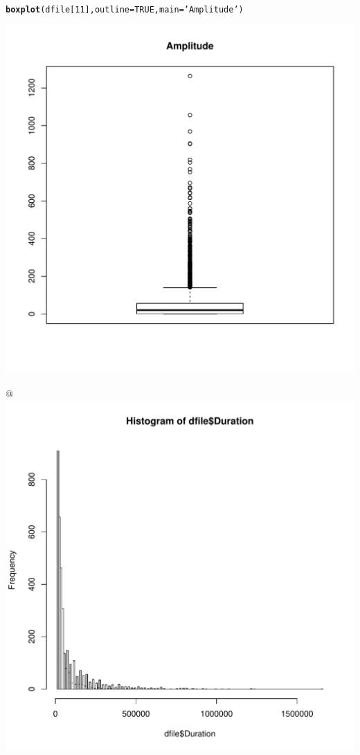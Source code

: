 \documentclass{article}\usepackage[]{graphicx}\usepackage[]{color}
\makeatletter
\def\maxwidth{ %
  \ifdim\Gin@nat@width>\linewidth
    \linewidth
  \else
    \Gin@nat@width
  \fi
}
\newcommand{\hlnum}[1]{\textcolor[rgb]{0.686,0.059,0.569}{#1}}%
\newcommand{\hlstr}[1]{\textcolor[rgb]{0.192,0.494,0.8}{#1}}%
\newcommand{\hlstd}[1]{\textcolor[rgb]{0.345,0.345,0.345}{#1}}%
\newcommand{\hlkwc}[1]{\textcolor[rgb]{0.333,0.667,0.333}{#1}}%
\newcommand{\hlkwd}[1]{\textcolor[rgb]{0.737,0.353,0.396}{\textbf{#1}}}%
\newenvironment{kframe}{%
 \def\at@end@of@kframe{}%
 \ifinner\ifhmode%
  \def\at@end@of@kframe{\end{minipage}}%
  \begin{minipage}{\columnwidth}%
 \fi\fi%
 \def\FrameCommand##1{\hskip\@totalleftmargin \hskip-\fboxsep
 \colorbox{shadecolor}{##1}\hskip-\fboxsep
     \hskip-\linewidth \hskip-\@totalleftmargin \hskip\columnwidth}%
 \MakeFramed {\advance\hsize-\width
   \@totalleftmargin\z@ \linewidth\hsize
   \@setminipage}}%
 {\par\unskip\endMakeFramed%
 \at@end@of@kframe}
\newenvironment{knitrout}{}{} %
\makeatother
\begin{document}
\begin{knitrout}
\color{fgcolor}\begin{kframe}
\begin{alltt}
\hlkwd{boxplot}\hlstd{(dfile[}\hlnum{11}\hlstd{],}\hlkwc{outline}\hlstd{=} \hlnum{TRUE}\hlstd{,} \hlkwc{main} \hlstd{=} \hlstr{'Amplitude'}\hlstd{)}
\end{alltt}
\end{kframe}
\includegraphics[width=\maxwidth]{figure/unnamed-chunk-5} 

\end{knitrout}
@
\begin{knitrout}
\color{fgcolor}
\includegraphics[width=\maxwidth]{figure/unnamed-chunk-6} 

\end{knitrout}
\end{document}
